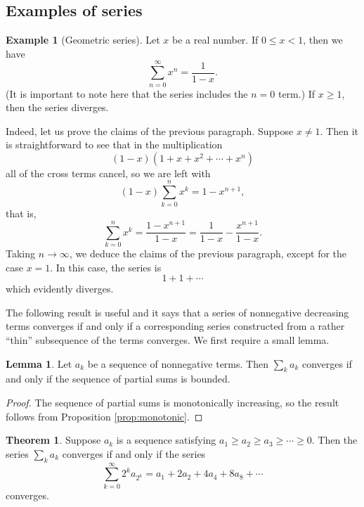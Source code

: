 \documentclass[12pt]{article}
\theoremstyle{definition}
\newtheorem{example}[definition]{Example}
\theoremstyle{theorem}
\newtheorem{theorem}[definition]{Theorem}
\newtheorem{lemma}[definition]{Lemma}
\begin{document}
\subsection{Examples of series}

\begin{example}[Geometric series]
Let $x$ be a real number. If $0 \leqslant x < 1$, then we have 
\[
\sum_{n=0}^\infty x^n = \frac{1}{1-x}.
\]
(It is important to note here that the series includes the $n=0$ term.) If $x \geqslant 1$, then the series diverges. 

Indeed, let us prove the claims of the previous paragraph. Suppose $x \ne 1$. Then it is straightforward to see that in the multiplication 
\[
(1 - x)(1 + x + x^2 + \cdots  + x^n)
\] 
all of the cross terms cancel, so we are left with 
\[
(1-x)\sum_{k=0}^n x^k = 1 - x^{n+1},
\]
that is, 
\[
\sum_{k=0}^n x^k = \frac{1 - x^{n+1}}{1 - x} = \frac{1}{1-x} - \frac{x^{n+1}}{1-x}.
\]
Taking $n \to \infty$, we deduce the claims of the previous paragraph, except for the case $x = 1$. In this case, the series is 
\[
1 + 1 + \cdots
\]
which evidently diverges. 
\end{example}

The following result is useful and it says that a series of nonnegative decreasing terms converges if and only if a corresponding series constructed from a rather ``thin'' subsequence of the terms converges. We first require a small lemma. 

\begin{lemma}
Let $a_k$ be a sequence of nonnegative terms. Then $\sum_k a_k$ converges if and only if the sequence of partial sums is bounded. 
\end{lemma}

\begin{proof}
The sequence of partial sums is monotonically increasing, so the result follows from Proposition \ref{prop:monotonic}.
\end{proof}


\begin{theorem}\label{thm:slice}
Suppose $a_k$ is a sequence satisfying $a_1 \geqslant a_2 \geqslant a_3 \geqslant \cdots \geqslant 0$. Then the series $\sum_k a_k$ converges if and only if the series 
\[
\sum_{k=0}^\infty2^k a_{2^k} = a_1 + 2a_2 + 4a_4 + 8a_8 + \cdots
\]
converges. 
\end{theorem}
\end{document}
